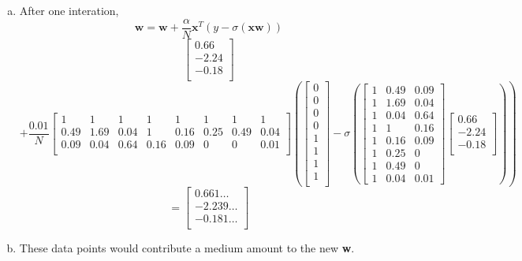 \documentclass[12pt]{article}
\begin{document}
\begin{enumerate}[(a)]
	\item 
	After one interation, \[ \mathbf{w} = \textbf{w} + \dfrac{\alpha}{N}\mathbf{x}^T \left(y - \sigma{(\textbf{x}\textbf{w})}\right) \]
	\[\begin{bmatrix}
		0.66\\
		-2.24\\
		-0.18\\
	\end{bmatrix}
	\]
	\[
	+
	\dfrac{0.01}{N} 
	\begin{bmatrix}
		1 & 1 & 1 & 1 & 1 & 1 & 1 & 1\\
		0.49 & 1.69 & 0.04 & 1 & 0.16 & 0.25 & 0.49 & 0.04\\
		0.09 & 0.04 & 0.64 & 0.16 & 0.09 & 0 & 0 & 0.01\\
	\end{bmatrix}
	\left(\begin{bmatrix}
		0\\
		0\\
		0\\
		0\\
		1\\
		1\\
		1\\
		1\\
	\end{bmatrix} - 
	\sigma \left(\begin{bmatrix}
	1 & 0.49 & 0.09\\
	1 & 1.69 & 0.04\\
	1 & 0.04 & 0.64\\
	1 & 1 & 0.16\\
	1 & 0.16 & 0.09\\
	1 & 0.25 & 0\\
	1 & 0.49 & 0\\
	1 & 0.04 & 0.01
	\end{bmatrix}
	\begin{bmatrix}
		0.66\\
		-2.24\\
		-0.18\\
	\end{bmatrix}
	\right)
	\right)
	\]
	\[=\begin{bmatrix}
		0.661\ldots\\
		-2.239\ldots\\
		-0.181\ldots\\
	\end{bmatrix}\]

	\item These data points would contribute a medium amount to the new \textbf{w}.
	

\end{enumerate}
\end{document}

